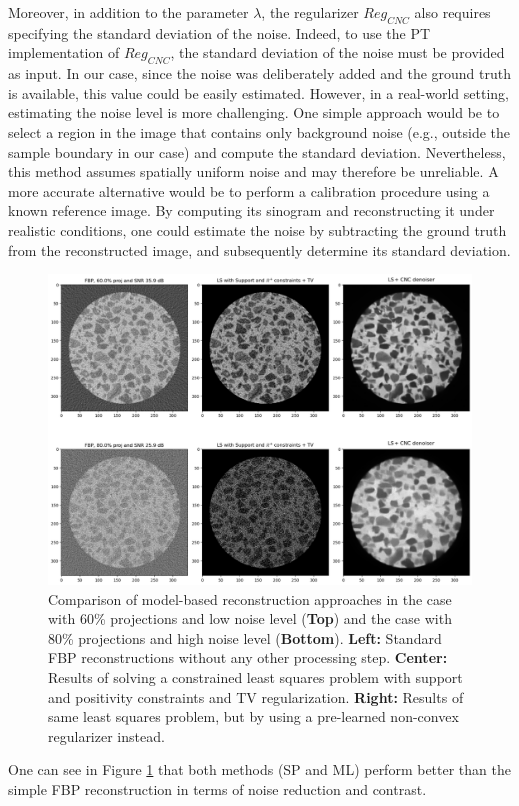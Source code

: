 \documentclass{article}
\begin{document}
Moreover, in addition to the parameter $\lambda$, the regularizer $Reg_{CNC}$ also requires specifying the standard deviation of the noise. Indeed, to use the PT implementation of $Reg_{CNC}$, the standard deviation of the noise must be provided as input. In our case, since the noise was deliberately added and the ground truth is available, this value could be easily estimated. However, in a real-world setting, estimating the noise level is more challenging. One simple approach would be to select a region in the image that contains only background noise (e.g., outside the sample boundary in our case) and compute the standard deviation. Nevertheless, this method assumes spatially uniform noise and may therefore be unreliable. A more accurate alternative would be to perform a calibration procedure using a known reference image. By computing its sinogram and reconstructing it under realistic conditions, one could estimate the noise by subtracting the ground truth from the reconstructed image, and subsequently determine its standard deviation.


\begin{figure}[H]
    \centering
    \includegraphics[scale=0.83]{figures/image.png}
    \caption{Comparison of model-based reconstruction approaches in the case with 60\% projections and low noise level (\textbf{Top}) and the case with 80\% projections and high noise level (\textbf{Bottom}).
\textbf{Left:} Standard FBP reconstructions without any other processing step.
\textbf{Center:} Results of solving a constrained least squares problem with support and positivity constraints and TV regularization.
\textbf{Right:} Results of same  least squares problem, but by using a pre-learned non-convex regularizer instead.}
    \label{fig:model_based}
\end{figure}
One can see in Figure \ref{fig:model_based} that both methods (SP and ML) perform better than the simple FBP reconstruction in terms of noise reduction and contrast.
\medskip
\end{document}
